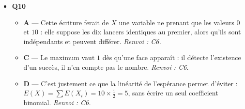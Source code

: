 \begin{itemize}
\begin{itemize}
    \item \textbf{D} — Un intervalle d'un écart-type autour de la moyenne couvre environ $68\%$ des cas dans le modèle normal, très loin des $95\%$ demandés. \emph{Renvoi : C4.}
  \end{itemize}
  \item \textbf{Q10}
  \begin{itemize}
    \item \textbf{A} — Cette écriture ferait de $X$ une variable ne prenant que les valeurs $0$ et $10$ : elle suppose les dix lancers identiques au premier, alors qu'ils sont indépendants et peuvent différer. \emph{Renvoi : C6.}
    \item \textbf{C} — Le maximum vaut $1$ dès qu'une face apparaît : il détecte l'existence d'un succès, il n'en compte pas le nombre. \emph{Renvoi : C6.}
    \item \textbf{D} — C'est justement ce que la linéarité de l'espérance permet d'éviter : $E(X)=\sum E(X_i)=10\times\tfrac12=5$, sans écrire un seul coefficient binomial. \emph{Renvoi : C6.}
  \end{itemize}
\end{itemize}
\fi
